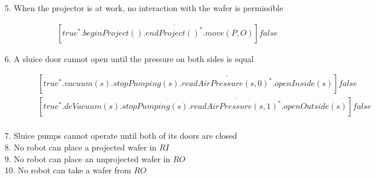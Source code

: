 \begin{description}
 
 \item[5. When the projector is at work, no interaction with the wafer is permissible]
 	\begin{align*}
 		&[true^*.beginProject().\overline{endProject()^*}.move(P,O)]false
	\end{align*}
	
 \item[6. A sluice door cannot open until the pressure on both sides is equal]
	\begin{align*}
		&[true^*.vacuum(s).stopPumping(s).\overline{readAirPressure(s,0)^*}.openInside(s)]false \\
		&[true^*.deVacuum(s).stopPumping(s).\overline{readAirPressure(s,1)^*}.openOutside(s)]false \\
	\end{align*}
	
 \item[7. Sluice pumps cannot operate until both of its doors are closed]

 \item[8. No robot can place a projected wafer in $RI$]

 \item[9. No robot can place an unprojected wafer in $RO$]

 \item[10. No robot can take a wafer from $RO$]

\end{description}
